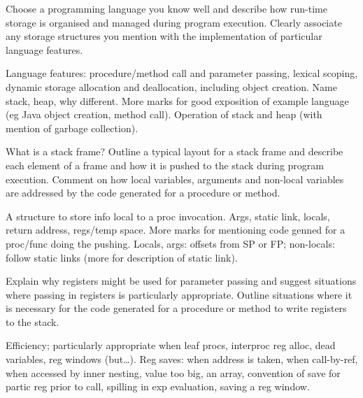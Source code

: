 \documentclass[11pt]{cityexam}
\begin{document}
\begin{questions}
\begin{subquestions}
\end{subquestions}

\question


\begin{subquestions}

\subquestion
Choose a programming language you know well and describe
how run-time storage is organised and managed during program 
execution.
Clearly associate any storage structures you
mention with the implementation of particular 
language features.

\begin{modelanswer}
Language features: procedure/method call and parameter passing,
lexical scoping, dynamic storage allocation and deallocation,
including object creation. Name stack, heap, why different.
More marks for good exposition of example language
(eg Java object creation, method call). Operation of
stack and heap (with mention of garbage collection).
\end{modelanswer}


\subquestion
What is a stack frame?
Outline a typical layout for a stack frame and describe 
each element of a frame and how it is pushed to the stack during
program execution. 
Comment on how local variables, arguments and non-local variables
are addressed by the code generated for a procedure or method. 

\begin{modelanswer}
A structure to store info local to a proc invocation.
Args, static link, locals, return address, regs/temp space.
More marks for mentioning code genned for a proc/func doing the
pushing.
Locals, args: offsets from SP or FP; non-locals: follow static links
(more for description of static link).
\end{modelanswer}

\subquestion
Explain why registers might be used for parameter passing and
suggest situations where passing in registers is particularly
appropriate. 
Outline situations where it is necessary for the code generated for a 
procedure or method to write registers to the stack.

\begin{modelanswer}
Efficiency; particularly appropriate when leaf procs, interproc
reg alloc, dead variables, reg windows (but\ldots).
Reg saves: when address is taken,
when call-by-ref,
when accessed by inner nesting,
value too big,
an array,
convention of save for partic reg prior to call,
spilling in exp evaluation,
saving a reg window.
\end{modelanswer}

\end{subquestions}


\end{questions}
\end{document}

